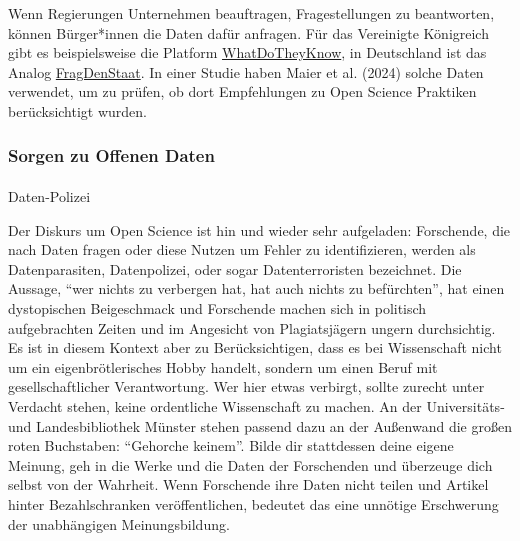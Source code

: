 \documentclass[
  letterpaper,
  DIV=11,
  numbers=noendperiod]{scrreprt}
\makeatletter
\let\oldparagraph\paragraph
\renewcommand{\paragraph}{
    \@ifstar
      \xxxParagraphStar
      \xxxParagraphNoStar
  }
\newcommand{\xxxParagraphStar}[1]{\oldparagraph*{#1}\mbox{}}
\newcommand{\xxxParagraphNoStar}[1]{\oldparagraph{#1}\mbox{}}
\makeatother
\begin{document}
\begin{tcolorbox}[enhanced jigsaw, left=2mm, colback=white, colframe=quarto-callout-note-color-frame, opacitybacktitle=0.6, opacityback=0, title=\textcolor{quarto-callout-note-color}{\faInfo}\hspace{0.5em}{Forschungsdaten bei Regierungen anfragen}, toptitle=1mm, coltitle=black, colbacktitle=quarto-callout-note-color!10!white, titlerule=0mm, bottomtitle=1mm, leftrule=.75mm, breakable, rightrule=.15mm, bottomrule=.15mm, toprule=.15mm, arc=.35mm]

Wenn Regierungen Unternehmen beauftragen, Fragestellungen zu
beantworten, können Bürger*innen die Daten dafür anfragen. Für das
Vereinigte Königreich gibt es beispielsweise die Platform
\href{https://www.whatdotheyknow.com/request/trial_protocols_behavioural_insi_2}{WhatDoTheyKnow},
in Deutschland ist das Analog
\href{https://fragdenstaat.de}{FragDenStaat}. In einer Studie haben
Maier et al. (2024) solche Daten verwendet, um zu prüfen, ob dort
Empfehlungen zu Open Science Praktiken berücksichtigt wurden.

\end{tcolorbox}

\subsubsection{Sorgen zu Offenen Daten}\label{sorgen-zu-offenen-daten}

\paragraph{Daten-Polizei}\label{daten-polizei}

Der Diskurs um Open Science ist hin und wieder sehr aufgeladen:
Forschende, die nach Daten fragen oder diese Nutzen um Fehler zu
identifizieren, werden als Datenparasiten, Datenpolizei, oder sogar
Datenterroristen bezeichnet. Die Aussage, ``wer nichts zu verbergen hat,
hat auch nichts zu befürchten'', hat einen dystopischen Beigeschmack und
Forschende machen sich in politisch aufgebrachten Zeiten und im
Angesicht von Plagiatsjägern ungern durchsichtig. Es ist in diesem
Kontext aber zu Berücksichtigen, dass es bei Wissenschaft nicht um ein
eigenbrötlerisches Hobby handelt, sondern um einen Beruf mit
gesellschaftlicher Verantwortung. Wer hier etwas verbirgt, sollte
zurecht unter Verdacht stehen, keine ordentliche Wissenschaft zu machen.
An der Universitäts- und Landesbibliothek Münster stehen passend dazu an
der Außenwand die großen roten Buchstaben: ``Gehorche keinem''. Bilde
dir stattdessen deine eigene Meinung, geh in die Werke und die Daten der
Forschenden und überzeuge dich selbst von der Wahrheit. Wenn Forschende
ihre Daten nicht teilen und Artikel hinter Bezahlschranken
veröffentlichen, bedeutet das eine unnötige Erschwerung der unabhängigen
Meinungsbildung.
\end{document}
